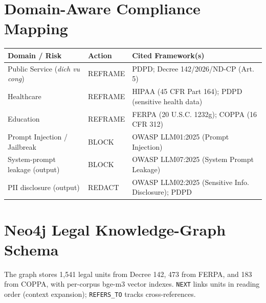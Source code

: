 \documentclass[11pt, a4paper]{article}
\begin{document}
\section{Domain-Aware Compliance Mapping}
\label{app:compliance}
\begin{table}[H]
    \centering
    \begin{tabularx}{\textwidth}{l l X}
        \toprule
        \textbf{Domain / Risk} & \textbf{Action} & \textbf{Cited Framework(s)} \\
        \midrule
        Public Service (\textit{dich vu cong}) & REFRAME & PDPD; Decree 142/2026/ND-CP (Art. 5) \\
        Healthcare & REFRAME & HIPAA (45 CFR Part 164); PDPD (sensitive health data) \\
        Education & REFRAME & FERPA (20 U.S.C. 1232g); COPPA (16 CFR 312) \\
        Prompt Injection / Jailbreak & BLOCK & OWASP LLM01:2025 (Prompt Injection) \\
        System-prompt leakage (output) & BLOCK & OWASP LLM07:2025 (System Prompt Leakage) \\
        PII disclosure (output) & REDACT & OWASP LLM02:2025 (Sensitive Info. Disclosure); PDPD \\
        \bottomrule
    \end{tabularx}
\end{table}

\section{Neo4j Legal Knowledge-Graph Schema}
\label{app:schema}
The graph stores 1,541 legal units from Decree 142, 473 from FERPA, and 183 from COPPA, with per-corpus bge-m3 vector indexes. \texttt{NEXT} links units in reading order (context expansion); \texttt{REFERS\_TO} tracks cross-references.
\end{document}
